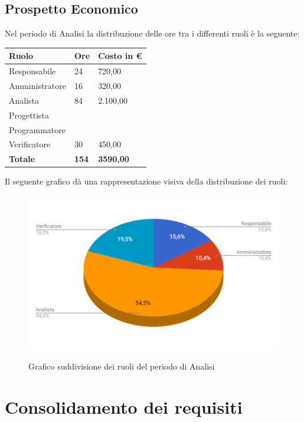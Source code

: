 \documentclass[PianoDiProgetto.tex]{subfiles}
\begin{document}
\subsection{Prospetto Economico}
Nel periodo di Analisi la distribuzione delle ore tra i differenti ruoli è la seguente:\\
\begin{table}[htbp]
	\centering
	\renewcommand\arraystretch{1.5}
	\begin{tabularx}{\textwidth}{p{5cm}|p{4cm}|p{4cm}}
		\hline
		\textbf{Ruolo} & \textbf{Ore} & \textbf{Costo in \euro} \\
		\hline
		Responsabile & 24 & 720,00 \\
		\hline
		Amministratore & 16 & 320,00 \\
		\hline
		Analista & 84 & 2.100,00 \\
		\hline
		Progettista & \ & \ \\
		\hline
		Programmatore & \ & \ \\
		\hline
		Verificatore & 30 & 450,00 \\
		\hline
		\textbf{Totale} & \textbf{154} & \textbf{3590,00}\\
		\hline
	\end{tabularx}
\end{table} \newpage
Il seguente grafico dà una rappresentazione visiva della distribuzione dei ruoli:
\begin{figure}[h]
	\includegraphics[width=14.5cm]{images/prospettoEconomico/analisi.png}
	\label{fig:foo}
	\caption{Grafico suddivisione dei ruoli del periodo di Analisi}
\end{figure} 
\clearpage
\section{Consolidamento dei requisiti}
\end{document}
